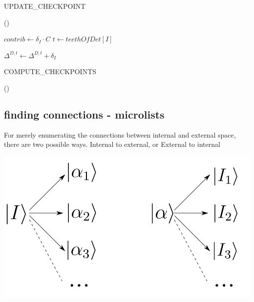 \documentclass[./thesis.tex]{subfiles}
\begin{document}
\begin{algorithm}
	\label{UPDATE_CHECKPOINT}
	\caption{UPDATE\_CHECKPOINT}
		
	
		\Fn(){\FUpdateCheckpoints{}}{
			$contrib \gets \delta_I \cdot C$ \;
			$t \gets teethOfDet[I]$ \;

			

				$\Delta^{D,t} \gets \Delta^{D,t} + \delta_I$ \;

		}
		
\end{algorithm}
\begin{algorithm}
	\label{COMPUTE_CHECKPOINTS}
	\caption{COMPUTE\_CHECKPOINTS}
		
	
		\Fn(){}{
		}
\end{algorithm}



\subsection{finding connections - microlists}

For merely enumerating the connections between internal and external space, there are two possible ways.
Internal to external, or External to internal
	\begin{center}
		\includegraphics[width=0.5\columnwidth]{figures/matrix_dressing/interactions}
	\end{center}
\end{document}
